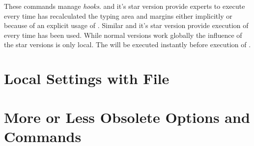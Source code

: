 \begin{Declaration}
\end{Declaration}%
These commands manage \emph{hooks}.  and it's
star version provide experts to execute  every time
 has recalculated the typing area and margins either
implicitly or because of an explicit usage of
. Similar
 and it's star
version provide execution of  every time
 has been used. While normal versions work
globally the influence of the star versions is only local. The
 will be executed instantly before execution of
.%
% 
\EndIndexGroup


\section{Local Settings with File }
\BeginIndexGroup
{}

%
\EndIndexGroup

\section{More or Less Obsolete Options and Commands}
%
\EndIndexGroup

\endinput


